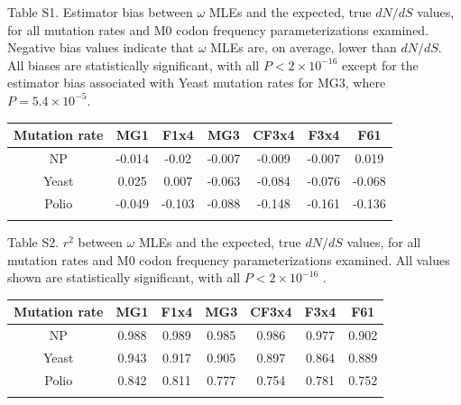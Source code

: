 \documentclass{pnastwo}
\begin{document}
\newpage


\noindent Table S1. Estimator bias between $\omega$ MLEs and the expected, true $dN/dS$ values, for all mutation rates and M0 codon frequency parameterizations examined. Negative bias values indicate that $\omega$ MLEs are, on average, lower than $dN/dS$. All biases are statistically significant, with all $P < 2\times10^{-16}$ except for the estimator bias associated with Yeast mutation rates for MG3, where $P = 5.4\times10^{-5}$.
\begin{table}[htbp]
	\begin{tabular}{c c c c c c c}
		\hline\noalign{\smallskip}
		Mutation rate & MG1 & F1x4 & MG3 & CF3x4 & F3x4 & F61 \\
		\hline\noalign{\smallskip}
		NP & -0.014 & -0.02 & -0.007 & -0.009 & -0.007 & 0.019 \\ 
		Yeast & 0.025 & 0.007 & -0.063 & -0.084 & -0.076 & -0.068 \\ 
		Polio & -0.049 & -0.103 & -0.088 & -0.148 & -0.161 & -0.136 \\ 
		\noalign{\smallskip}\hline\noalign{\smallskip}
	\end{tabular}
\end{table}	


\vspace{2cm}

\noindent Table S2. $r^2$ between $\omega$ MLEs and the expected, true $dN/dS$ values, for all mutation rates and M0 codon frequency parameterizations examined. All values shown are statistically significant, with all $P < 2\times10^{-16}$ .
\begin{table}[htbp]
	\begin{tabular}{c c c c c c c}
		\hline\noalign{\smallskip}
		Mutation rate & MG1 & F1x4 & MG3 & CF3x4 & F3x4 & F61 \\
		\hline\noalign{\smallskip}
		NP & 0.988 & 0.989 & 0.985 & 0.986 & 0.977 & 0.902 \\ 
		Yeast & 0.943 & 0.917 & 0.905 & 0.897 & 0.864 & 0.889 \\ 
		Polio & 0.842 & 0.811 & 0.777 & 0.754 & 0.781 & 0.752 \\ 
		\noalign{\smallskip}\hline\noalign{\smallskip}
	\end{tabular}
\end{table}	
\end{document}
